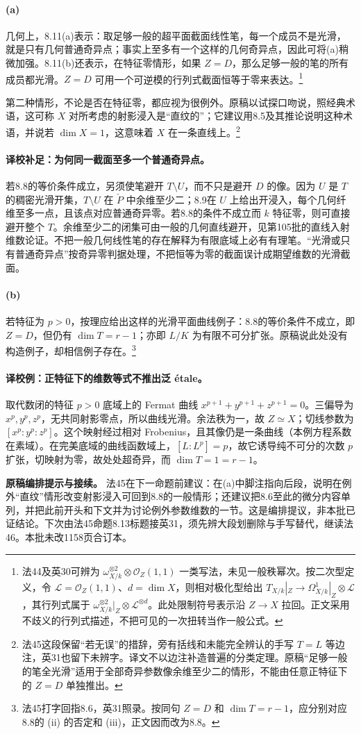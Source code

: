 \documentclass[openany,fontset=fandol]{ctexbook}
\newcommand{\PD}{\check P}
\begin{document}
\paragraph{(a)}
几何上，8.11(a)表示：取足够一般的超平面截面线性笔，每一个成员不是光滑，就是只有几何普通奇异点；事实上至多有一个这样的几何奇异点，因此可将(a)稍微加强。8.11(b)还表示，在特征零情形，如果 $Z=D$，那么足够一般的笔的所有成员都光滑。$Z=D$ 可用一个可逆模的行列式截面恒等于零来表达。\footnote{法44及英30可辨为 $\omega_{X/k}^{\otimes2}\otimes\mathcal O_Z(1,1)$ 一类写法，未见一般秩幂次。按二次型定义，令 $\mathcal L=\mathcal O_Z(1,1)$、$d=\dim X$，则相对极化型给出 $T_{X/k}|_Z\to\Omega^1_{X/k}|_Z\otimes\mathcal L$，其行列式属于 $\omega_{X/k}^{\otimes2}|_Z\otimes\mathcal L^{\otimes d}$。此处限制符号表示沿 $Z\to X$ 拉回。正文采用不歧义的行列式描述，不把可见的一次扭转当作一般公式。}

第二种情形，不论是否在特征零，都应视为很例外。原稿以试探口吻说，照经典术语，这可称 $X$ 对所考虑的射影浸入是“直纹的”；它建议用8.5及其推论说明这种术语，并说若 $\dim X=1$，这意味着 $X$ 在一条直线上。\footnote{法45这段保留“若无误”的措辞，旁有括线和未能完全辨认的手写 $T=L$ 等边注，英31也留下未辨字。译文不以边注补造普遍的分类定理。原稿“足够一般的笔全光滑”适用于全部奇异参数像余维至少二的情形，不能由任意正特征下的 $Z=D$ 单独推出。}

\paragraph{译校补足：为何同一截面至多一个普通奇异点。}
若8.8的等价条件成立，另须使笔避开 $T\setminus U$，而不只是避开 $D$ 的像。因为 $U$ 是 $T$ 的稠密光滑开集，$T\setminus U$ 在 $\PD$ 中余维至少二；8.9在 $U$ 上给出开浸入，每个几何纤维至多一点，且该点对应普通奇异零。若8.8的条件不成立而 $k$ 特征零，则可直接避开整个 $T$。余维至少二的闭集可由一般的几何直线避开，见第105批的直线入射维数论证。不把一般几何线性笔的存在解释为有限底域上必有有理笔。“光滑或只有普通奇异点”按奇异零判据处理，不把恒等为零的截面误计成期望维数的光滑截面。

\paragraph{(b)}
若特征为 $p>0$，按理应给出这样的光滑平面曲线例子：8.8的等价条件不成立，即 $Z=D$，但仍有 $\dim T=r-1$；亦即 $L/K$ 为有限不可分扩张。原稿说此处没有构造例子，却相信例子存在。\footnote{法45打字回指8.6，英31照录。按同句 $Z=D$ 和 $\dim T=r-1$，应分别对应8.8的 (ii) 的否定和 (iii)，正文因而改为8.8。}

\paragraph{译校例：正特征下的维数等式不推出泛 étale。}
取代数闭的特征 $p>0$ 底域上的 Fermat 曲线 $x^{p+1}+y^{p+1}+z^{p+1}=0$。三偏导为 $x^p,y^p,z^p$，无共同射影零点，所以曲线光滑。余法秩为一，故 $Z\simeq X$；切线参数为 $[x^p:y^p:z^p]$。这个映射经过相对 Frobenius，且其像仍是一条曲线（本例方程系数在素域）。在完美底域的曲线函数域上，$[L:L^p]=p$，故它诱导纯不可分的次数 $p$ 扩张，切映射为零，故处处超奇异，而 $\dim T=1=r-1$。

\smallskip
\noindent\textbf{原稿编排提示与接续。}
法45在下一命题前建议：在(a)中脚注指向后段，说明在例外“直纹”情形改变射影浸入可回到8.8的一般情形；还建议把8.6至此的微分内容单列，并把此前开头和下文并为讨论例外参数维数的一节。这是编排提议，非本批已证结论。下次由法45命题8.13标题接英31，须先辨大段划删除与手写替代，继读法46。本批未改1158页合订本。
\end{document}
